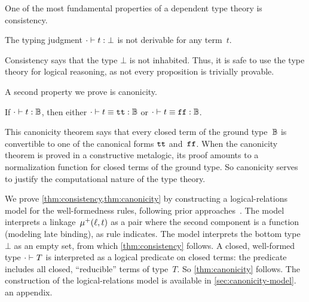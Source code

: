One of the most fundamental properties of a dependent type theory is consistency.
\begin{theorem}[Consistency]
\label{thm:consistency}
  The typing judgment $ {\cdot} \vdash {t} : {\bot} $ is not derivable for any term~$t$.
\end{theorem}

\noindent
Consistency says that the type $\bot$ is not inhabited.
Thus, it is safe to use the type theory for logical reasoning, as not
every proposition is trivially provable.


A second property we prove is canonicity.

\begin{theorem}[Canonicity]
\label{thm:canonicity}
  If $ {\cdot} \vdash {t} : {\mathbb{B}} $, then either $ {\cdot} \vdash {t \equiv \ensuremath{\texttt{tt}}} : {\mathbb{B}} $ or $ {\cdot} \vdash {t \equiv \ensuremath{\texttt{ff}}} : {\mathbb{B}} $.
\end{theorem}

\noindent
This canonicity theorem says that every closed term of the ground
type~$\mathbb{B}$ is convertible to one of the canonical forms $\texttt{tt}$ and~$\texttt{ff}$.
When the canonicity theorem is proved in a constructive meta\-logic, its proof
amounts to a normalization function for closed terms of the ground type.
So canonicity serves to justify the computational nature of the type theory.

We prove \cref{thm:consistency,thm:canonicity} by constructing a logical-relations model
for the well-formedness rules, following prior approaches~\cite{coquand2018canonicity,kaposi2019gluing,sterling2019algebraic}.
%
The model interprets a linkage~$\mu^+({\ell},{t})$ as a pair where the
second component is a function (modeling late binding),
as rule  indicates.
%
The model interprets the bottom type~$\bot$ as an empty set, from which
\cref{thm:consistency} follows.
A closed, well-formed type $ {\cdot} \vdash_{} {T} $ is interpreted as
a logical predicate on closed terms: the predicate includes all
closed, ``reducible'' terms of type~$T$. So \cref{thm:canonicity} follows.
The construction of the logical-relations model is available in
\ifreport
\cref{sec:canonicity-model}.
\else
an appendix.
\fi{}